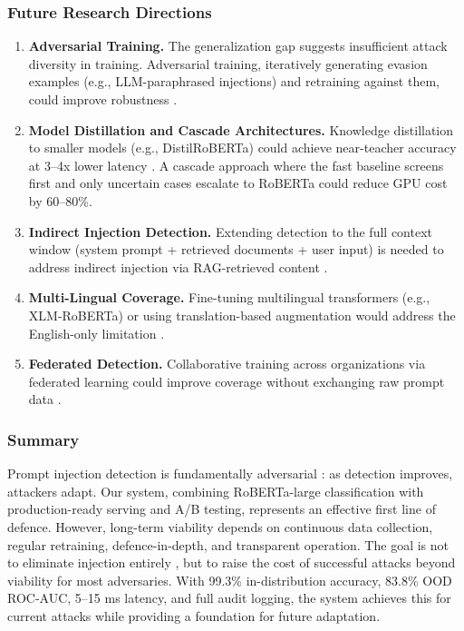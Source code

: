 \documentclass[12pt, letterpaper]{article}   %
\begin{document}
\subsubsection{Future Research Directions}

\begin{enumerate}
    \item \textbf{Adversarial Training.} The generalization gap suggests insufficient attack diversity in training. Adversarial training, iteratively generating evasion examples (e.g., LLM-paraphrased injections) and retraining against them, could improve robustness \cite{ref43}\cite{ref3}.

    \item \textbf{Model Distillation and Cascade Architectures.} Knowledge distillation to smaller models (e.g., DistilRoBERTa) could achieve near-teacher accuracy at 3--4x lower latency \cite{ref13}. A cascade approach where the fast baseline screens first and only uncertain cases escalate to RoBERTa could reduce GPU cost by 60--80\%.

    \item \textbf{Indirect Injection Detection.} Extending detection to the full context window (system prompt + retrieved documents + user input) is needed to address indirect injection via RAG-retrieved content \cite{ref4}\cite{ref21}\cite{ref35}.

    \item \textbf{Multi-Lingual Coverage.} Fine-tuning multilingual transformers (e.g., XLM-RoBERTa) or using translation-based augmentation would address the English-only limitation \cite{ref16}\cite{ref27}\cite{ref37}.

    \item \textbf{Federated Detection.} Collaborative training across organizations via federated learning could improve coverage without exchanging raw prompt data \cite{ref32}.
\end{enumerate}

\subsubsection{Summary}

Prompt injection detection is fundamentally adversarial \cite{ref3}\cite{ref40}: as detection improves, attackers adapt. Our system, combining RoBERTa-large classification with production-ready serving and A/B testing, represents an effective first line of defence. However, long-term viability depends on continuous data collection, regular retraining, defence-in-depth, and transparent operation. The goal is not to eliminate injection entirely \cite{ref4}\cite{ref20}, but to raise the cost of successful attacks beyond viability for most adversaries. With 99.3\% in-distribution accuracy, 83.8\% OOD ROC-AUC, 5--15 ms latency, and full audit logging, the system achieves this for current attacks while providing a foundation for future adaptation.
\end{document}
